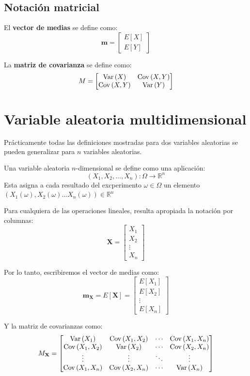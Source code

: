 \documentclass[a4paper]{book}
\renewcommand{\vec}[1]{\mathbf{#1}} %
\begin{document}
\subsection{Notación matricial}
El \textbf{vector de medias} se define como:
\[ \vec{m} = \left[ 
\begin{matrix}
	E \left[ X \right]\\ 
	E \left[ Y \right]
\end{matrix} \right] \]

La \textbf{matriz de covarianza} se define como:
\[M=\left[ 
\begin{matrix}
	\operatorname{Var} \left( X \right)& \operatorname{Cov} \left( X,Y \right)\\ 
	\operatorname{Cov} \left( X,Y \right)& \operatorname{Var} \left( Y \right)
\end{matrix} \right]\]

\section{Variable aleatoria multidimensional}

Prácticamente todas las definiciones mostradas para dos variables aleatorias se pueden generalizar para $n$ variables aleatorias.

Una variable aleatoria $n$-dimensional se define como una aplicación:
\[\left( X_1,X_2,\dots , X_n \right):\Omega \longrightarrow \mathbb{R}^n\]
Esta asigna a cada resultado del excperimento $\omega \in \Omega$ un elemento $\left( X_1(\omega ), X_2(\omega ) \dots X_n (\omega )\right)\in \mathbb{R}^n$

Para cualquiera de las operaciones lineales, resulta apropiada la notación por columnas:
\[\vec{X} = \left[ 
\begin{matrix}
	X_1\\ 
	X_2\\ 
	\vdots \\ 
	X_n
\end{matrix} \right]\]

Por lo tanto, escribiremos el vector de medias como:
\[\vec{m}_{\vec{X}} = E \left[ \vec{X} \right]= \left[ 
\begin{matrix}
	E \left[ X_1 \right]\\ 
	E \left[ X_2 \right]\\ 
	\vdots \\ 
	E \left[ X_n \right]
\end{matrix} \right] \]

Y la matriz de covarianzas como:
\[ M_{\vec{X}} = \left[ 
\begin{matrix}
	\Var \left( X_1 \right) & \Cov \left( X_1, X_2 \right) & \cdots & \Cov \left( X_1, X_n \right)\\ 
	\Cov \left( X_1, X_2 \right) & \Var \left( X_2 \right) & \cdots & \Cov \left( X_2, X_n \right)\\ 
	\vdots & \vdots & \ddots & \vdots \\
	\Cov \left( X_1,X_n \right) & \Cov \left( X_2, X_n \right) & \cdots & \Var \left( X_n \right)
\end{matrix} \right]\]
\end{document}
